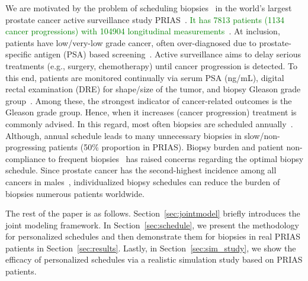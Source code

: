 We are motivated by the problem of scheduling biopsies~\citep{nieboer2018active} in the world's largest prostate cancer active surveillance study PRIAS~\citep{bokhorst2015compliance}. \textcolor{Green}{It has 7813 patients (1134 cancer progressions) with 104904 longitudinal measurements~\citep{tomer2020webapp}}. At inclusion, patients have low/very-low grade cancer, often over-diagnosed due to prostate-specific antigen (PSA) based screening~\citep{crawford2003epidemiology}. Active surveillance aims to delay serious treatments (e.g., surgery, chemotherapy) until cancer progression is detected. To this end, patients are monitored continually via serum PSA (ng/mL), digital rectal examination (DRE) for shape/size of the tumor, and biopsy Gleason grade group~\citep{epsteinGG2014}. Among these, the strongest indicator of cancer-related outcomes is the Gleason grade group. Hence, when it increases (cancer progression) treatment is commonly advised. In this regard, most often biopsies are scheduled annually~\citep{loeb2014heterogeneity}. Although, annual schedule leads to many unnecessary biopsies in slow/non-progressing patients (50\% proportion in PRIAS). Biopsy burden and patient non-compliance to frequent biopsies~\citep{bokhorst2015compliance} has raised concerns regarding the optimal biopsy schedule. Since prostate cancer has the second-highest incidence among all cancers in males~\citep{GlobalCancerStats2012}, individualized biopsy schedules can reduce the burden of biopsies numerous patients worldwide.

The rest of the paper is as follows. Section~\ref{sec:jointmodel} briefly introduces the joint modeling framework. In Section~\ref{sec:schedule}, we present the methodology for personalized schedules and then demonstrate them for biopsies in real PRIAS patients in Section~\ref{sec:results}. Lastly, in Section~\ref{sec:sim_study}, we show the efficacy of personalized schedules via a realistic simulation study based on PRIAS patients.